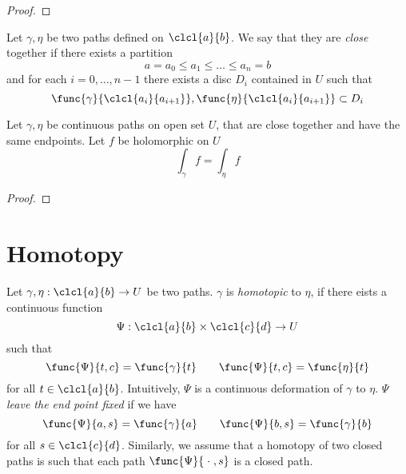 \begin{proof}
    
\end{proof}

\begin{definition}
    Let \(\gamma, \eta\) be two paths defined on \(\clcl{a}{b}\). We say that they are \textit{close} together if there exists a partition 
\begin{equation*}
    a = a_0 \leq a_1 \leq \dots \leq a_n = b
\end{equation*}
and for each \(i = 0, \dots , n- 1\) there exists a disc \(D_i\) contained in \(U\) such that 
\begin{equation*}
    \func{\gamma}{\clcl{a_i}{a_{i+1}}}, \func{\eta}{\clcl{a_i}{a_{i+1}}} \subset D_i
\end{equation*}
\end{definition}

\begin{lemma}
    Let \(\gamma, \eta\) be continuous paths on open set \(U\), that are close together and have the same endpoints. Let \(f\) be holomorphic on \(U\) 
    \begin{equation*}
        \int_{\gamma} f = \int_{\eta} f
    \end{equation*}
\end{lemma}

\begin{proof}
    
\end{proof}

\section{Homotopy}
Let \(\gamma, \eta: \clcl{a}{b} \to U\)  be two paths. \(\gamma\) is \textit{homotopic} to \(\eta\), if there eists a continuous function 
\begin{equation*}
    \Psi : \clcl{a}{b} \times \clcl{c}{d} \to U
\end{equation*}
such that 
\begin{equation*}
    \func{\Psi}{t,c} = \func{\gamma}{t} \qquad \func{\Psi}{t,c} = \func{\eta}{t}
\end{equation*}
for all \(t \in \clcl{a}{b}\). Intuitively, \(\Psi\) is a continuous deformation of \(\gamma\) to \(\eta\). \(\Psi\) \textit{leave the end point fixed} if we have 
\begin{equation*}
    \func{\Psi}{a,s} = \func{\gamma}{a} \qquad \func{\Psi}{b,s} = \func{\gamma}{b}
\end{equation*}
for all \(s \in \clcl{c}{d}\). Similarly, we assume that a homotopy of two closed paths is such that each path \(\func{\Psi}{\; \cdot \;, s}\) is a closed path. 

